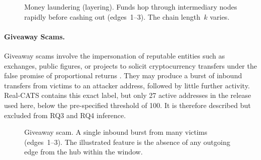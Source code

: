 \documentclass{thesisclass}
\begin{document}
\begin{figure}[ht]
  \centering
  \caption[Money laundering transfer sequence]{Money laundering (layering). Funds hop
    through intermediary nodes rapidly before cashing out (edges~1--3).
    The chain length~$k$ varies.}
  \label{fig:motif-laundering}
\end{figure}

\paragraph{Giveaway Scams.}
Giveaway scams involve the impersonation of reputable entities such as exchanges, public figures, or projects to solicit cryptocurrency transfers under the false promise of proportional returns \citep{hornuf2025cybercrime}. They may produce a burst of inbound transfers from victims to an attacker address, followed by little further activity. Real-CATS contains this exact label, but only 27 active addresses in the release used here, below the pre-specified threshold of 100. It is therefore described but excluded from RQ3 and RQ4 inference.

\begin{figure}[ht]
  \centering
  \caption[Giveaway transfer sequence]{Giveaway scam. A single inbound burst from
    many victims (edges~1--3). The illustrated feature is the absence of any
    outgoing edge from the hub within the window.}
  \label{fig:motif-giveaway}
\end{figure}
\end{document}
